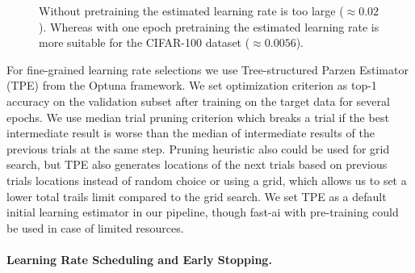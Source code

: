 \documentclass[runningheads]{llncs}
\begin{document}
\begin{figure}[t]
  \centering
  \caption{Without pretraining the estimated learning rate is too large ($\approx 0.02$). Whereas with one epoch pretraining the
   estimated learning rate is more suitable for the CIFAR-100 dataset ($\approx 0.0056$).}
  \label{fig:fast_ai}
\end{figure}

For fine-grained learning rate selections we use Tree-structured Parzen Estimator (TPE) from the Optuna \cite{optuna_2019} framework.
We set optimization criterion as top-1 accuracy on the validation subset after training on the target data for several epochs.
We use median trial pruning criterion which breaks a trial if the best intermediate result is worse than the median of intermediate results of
the previous trials at the same step. Pruning heuristic also could be used for grid search, but TPE also generates locations of the
next trials based on previous trials locations instead of random choice or using a grid, which allows us to set a lower total trails limit compared to the
grid search. We set TPE as a default initial learning estimator in our pipeline, though fast-ai with pre-training could be used
in case of limited resources.

\paragraph{Learning Rate Scheduling and Early Stopping.}
\end{document}
